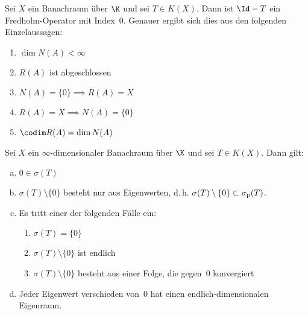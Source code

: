 \begin{thSatz} \label{vl21:satz8.16}
    Sei $X$ ein Banachraum über $\K$ und sei $T\in K(X)$.
    Dann ist $\Id-T$ ein Fredholm-Operator mit Index~$0$.
    Genauer ergibt sich dies aus den folgenden Einzelaussagen:
    \begin{enumerate}[(1),leftmargin=1.8cm,labelsep=1.5em]
        \item
            $\dim N(A) < \infty$
        \item
            $R(A)$ ist abgeschlossen
        \item
            $N(A)=\{0\} \implies R(A) = X$
        \item
            $R(A) = X \implies N(A) = \{0\}$
        \item
            $\codim R(A) = \dim N(A)$
    \end{enumerate}
\end{thSatz}


\begin{thSatz} \label{vl21:spektralsatz}
    Sei $X$ ein $\infty$-dimensionaler Banachraum über $\K$ und sei $T\in K(X)$.
    Dann gilt:
    \begin{enumerate}[(a)]
        \item
            $0\in \sigma(T)$
        \item
            $\sigma(T)\setminus\{0\}$ besteht nur aus Eigenwerten, d.\,h.
            $\sigma(T)\setminus\{0\} \subset \sigma_{\mathrm p}(T)$.
        \item
            Es tritt einer der folgenden Fälle ein:
            \begin{enumerate}[(1),leftmargin=*,labelsep=1em]
                \item
                    $\sigma(T) = \{0\}$
                \item
                    $\sigma(T) \setminus \{0\}$ ist endlich
                \item
                    $\sigma(T) \setminus \{0\}$ besteht aus einer Folge,
                    die gegen~$0$ konvergiert
            \end{enumerate}
        \item
            Jeder Eigenwert verschieden von~$0$ hat einen endlich-dimensionalen Eigenraum.
    \end{enumerate}
\end{thSatz}

